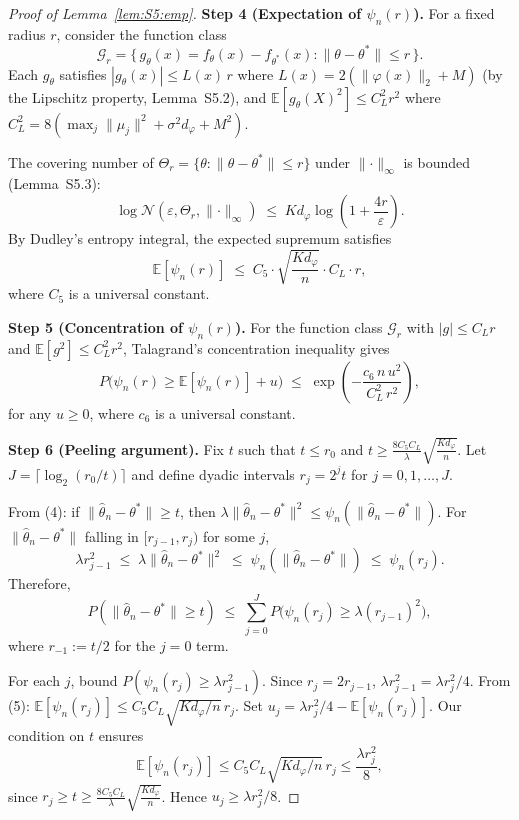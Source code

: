 \documentclass[twoside]{article}
\theoremstyle{plain}
\theoremstyle{definition}
\theoremstyle{remark}
\newcommand{\E}{\mathbb{E}}
\newcommand{\1}{\mathbf{1}}
\renewcommand{\epsilon}{\varepsilon}
\renewcommand{\phi}{\varphi}
\newcommand{\htheta}{\hat{\theta}}
\newcommand{\norm}[1]{\lVert#1\rVert}
\begin{document}
\begin{proof}[Proof of Lemma~\ref{lem:S5:emp}]
\noindent\textbf{Step 4 (Expectation of $\psi_n(r)$).}
For a fixed radius $r$, consider the function class
\[
\mathcal{G}_r=\{\,g_\theta(x)=f_\theta(x)-f_{\theta^*}(x):
               \norm{\theta-\theta^*}\le r\,\}.
\]
Each $g_\theta$ satisfies $|g_\theta(x)|\le L(x)\,r$ where
$L(x)=2(\norm{\phi(x)}_2+M)$ (by the Lipschitz property,
Lemma~S5.2), and $\E[g_\theta(X)^2]\le C_L^2 r^2$ where
$C_L^2=8(\max_j\norm{\mu_j}^2+\sigma^2 d_\phi+M^2)$.

The covering number of $\Theta_r=\{\theta:\norm{\theta-\theta^*}\le r\}$
under $\norm{\cdot}_\infty$ is bounded (Lemma~S5.3):
\[
\log\mathcal{N}(\epsilon,\Theta_r,\norm{\cdot}_\infty)
\;\le\; K d_\phi\log\!\left(1+\frac{4r}{\epsilon}\right).
\]
By Dudley's entropy integral, the expected supremum satisfies
\begin{equation}
\E[\psi_n(r)]
\;\le\; C_5\cdot\sqrt{\frac{K d_\phi}{n}}\cdot C_L\cdot r,
\tag{5}
\end{equation}
where $C_5$ is a universal constant.

\noindent\textbf{Step 5 (Concentration of $\psi_n(r)$).}
For the function class $\mathcal{G}_r$ with $|g|\le C_L r$ and
$\E[g^2]\le C_L^2 r^2$, Talagrand's concentration inequality gives
\begin{equation}
P\bigl(\psi_n(r)\ge\E[\psi_n(r)]+u\bigr)
\;\le\; \exp\!\left(-\frac{c_6\,n\,u^2}{C_L^2\,r^2}\right),
\tag{6}
\end{equation}
for any $u\ge0$, where $c_6$ is a universal constant.

\noindent\textbf{Step 6 (Peeling argument).}
Fix $t$ such that $t\le r_0$ and
$t\ge\frac{8C_5 C_L}{\lambda}\sqrt{\frac{K d_\phi}{n}}$.
Let $J=\lceil\log_2(r_0/t)\rceil$ and define dyadic intervals
$r_j=2^j t$ for $j=0,1,\dots,J$.

From (4): if $\norm{\htheta_n-\theta^*}\ge t$, then
$\lambda\norm{\htheta_n-\theta^*}^2\le\psi_n(\norm{\htheta_n-\theta^*})$.
For $\norm{\htheta_n-\theta^*}$ falling in $[r_{j-1},r_j)$ for some $j$,
\[
\lambda r_{j-1}^2 \;\le\; \lambda\norm{\htheta_n-\theta^*}^2
\;\le\; \psi_n(\norm{\htheta_n-\theta^*}) \;\le\; \psi_n(r_j).
\]
Therefore,
\begin{equation}
P(\norm{\htheta_n-\theta^*}\ge t)
\;\le\; \sum_{j=0}^J P\bigl(\psi_n(r_j)\ge\lambda (r_{j-1})^2\bigr),
\tag{7}
\end{equation}
where $r_{-1}:=t/2$ for the $j=0$ term.

For each $j$, bound $P(\psi_n(r_j)\ge\lambda r_{j-1}^2)$.
Since $r_j=2r_{j-1}$, $\lambda r_{j-1}^2=\lambda r_j^2/4$.
From (5): $\E[\psi_n(r_j)]\le C_5 C_L\sqrt{K d_\phi/n}\,r_j$.
Set $u_j=\lambda r_j^2/4-\E[\psi_n(r_j)]$.  Our condition on $t$ ensures
\[
\E[\psi_n(r_j)]\le C_5 C_L\sqrt{K d_\phi/n}\,r_j
\le\frac{\lambda r_j^2}{8},
\]
since $r_j\ge t\ge\frac{8C_5 C_L}{\lambda}\sqrt{\frac{K d_\phi}{n}}$.
Hence $u_j\ge\lambda r_j^2/8$.


\end{proof}
\end{document}
